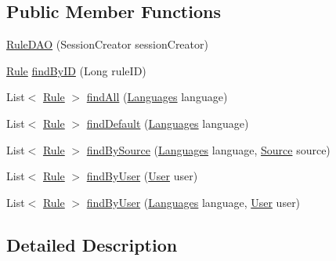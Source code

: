\subsection*{Public Member Functions}
\begin{DoxyCompactItemize}
\item 
\hyperlink{classbr_1_1usp_1_1cata_1_1dao_1_1_rule_d_a_o_a9f84368e073cde179d0905e425e2a1c2}{Rule\+D\+A\+O} (Session\+Creator session\+Creator)
\item 
\hyperlink{classbr_1_1usp_1_1cata_1_1model_1_1_rule}{Rule} \hyperlink{classbr_1_1usp_1_1cata_1_1dao_1_1_rule_d_a_o_a4ed58dc7ffd9983fe9f635de55787cf6}{find\+By\+I\+D} (Long rule\+I\+D)
\item 
List$<$ \hyperlink{classbr_1_1usp_1_1cata_1_1model_1_1_rule}{Rule} $>$ \hyperlink{classbr_1_1usp_1_1cata_1_1dao_1_1_rule_d_a_o_a70924fca7fe0a73d7dc07153ba56c381}{find\+All} (\hyperlink{enumbr_1_1usp_1_1cata_1_1model_1_1_languages}{Languages} language)
\item 
List$<$ \hyperlink{classbr_1_1usp_1_1cata_1_1model_1_1_rule}{Rule} $>$ \hyperlink{classbr_1_1usp_1_1cata_1_1dao_1_1_rule_d_a_o_a00d2a2b86e3c826cdccf4776ba9996c7}{find\+Default} (\hyperlink{enumbr_1_1usp_1_1cata_1_1model_1_1_languages}{Languages} language)
\item 
List$<$ \hyperlink{classbr_1_1usp_1_1cata_1_1model_1_1_rule}{Rule} $>$ \hyperlink{classbr_1_1usp_1_1cata_1_1dao_1_1_rule_d_a_o_ad469a8ca60c9ae60eedc1454a99edd67}{find\+By\+Source} (\hyperlink{enumbr_1_1usp_1_1cata_1_1model_1_1_languages}{Languages} language, \hyperlink{classbr_1_1usp_1_1cata_1_1model_1_1_source}{Source} source)
\item 
List$<$ \hyperlink{classbr_1_1usp_1_1cata_1_1model_1_1_rule}{Rule} $>$ \hyperlink{classbr_1_1usp_1_1cata_1_1dao_1_1_rule_d_a_o_add63c4a13558e41488b8dab179f3cb69}{find\+By\+User} (\hyperlink{classbr_1_1usp_1_1cata_1_1model_1_1_user}{User} user)
\item 
List$<$ \hyperlink{classbr_1_1usp_1_1cata_1_1model_1_1_rule}{Rule} $>$ \hyperlink{classbr_1_1usp_1_1cata_1_1dao_1_1_rule_d_a_o_a7dac40aeb00aa8badd44d9d34202b608}{find\+By\+User} (\hyperlink{enumbr_1_1usp_1_1cata_1_1model_1_1_languages}{Languages} language, \hyperlink{classbr_1_1usp_1_1cata_1_1model_1_1_user}{User} user)
\end{DoxyCompactItemize}


\subsection{Detailed Description}


